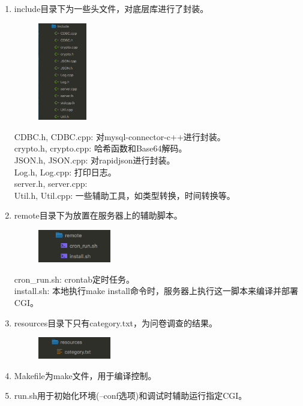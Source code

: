 \documentclass[UTF8]{article}
\begin{document}
\begin{enumerate}
    \item include目录下为一些头文件，对底层库进行了封装。\\
    \begin{figure}[H]
    \center
    \includegraphics[width=0.2\textwidth]{images/server2.png}
    \end{figure}
    \begin{tcolorbox}[colback=white]
        CDBC.h, CDBC.cpp: 对mysql-connector-c++进行封装。\\
        crypto.h, crypto.cpp: 哈希函数和Base64解码。\\
        JSON.h, JSON.cpp: 对rapidjson进行封装。\\
        Log.h, Log.cpp: 打印日志。\\
        server.h, server.cpp: \\
        Util.h, Util.cpp: 一些辅助工具，如类型转换，时间转换等。
    \end{tcolorbox}

    \item remote目录下为放置在服务器上的辅助脚本。\\
    \begin{figure}[H]
    \center
    \includegraphics[width=0.3\textwidth]{images/server4.png}
    \end{figure}
    \begin{tcolorbox}[colback=white]
        cron\_run.sh: crontab定时任务。\\
        install.sh: 本地执行make install命令时，服务器上执行这一脚本来编译并部署CGI。
    \end{tcolorbox}

    \item resources目录下只有category.txt，为问卷调查的结果。
    \begin{figure}[H]
    \center
    \includegraphics[width=0.3\textwidth]{images/server5.png}
    \end{figure}

    \item Makefile为make文件，用于编译控制。
    \item run.sh用于初始化环境(--conf选项)和调试时辅助运行指定CGI。
\end{enumerate}
\end{document}
